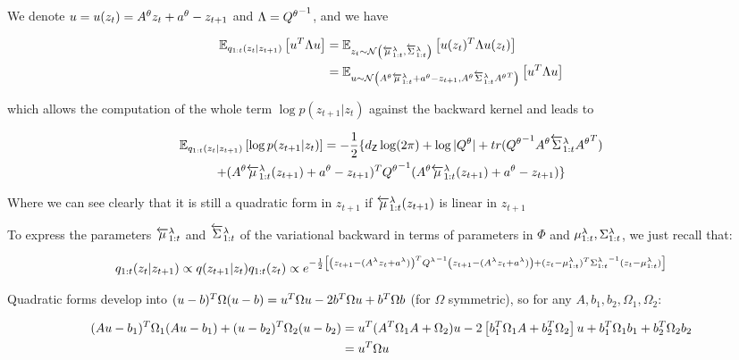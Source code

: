 \documentclass{article}
\begin{document}
We denote $u = u(z_t) = A^\theta z_t + a^\theta - z_{t+1}$ and $\Lambda = {Q^\theta}^{-1}$, and we have

\begin{align*}
    \mathbb{E}_{q_{1:t}(z_{t}|z_{t + 1})}\left[u^T \Lambda u\right] &= \mathbb{E}_{z_t \sim \mathcal{N}\left( \overleftarrow{\mu}_{1:t}^\lambda, \overleftarrow{\Sigma}_{1:t}^\lambda \right)}\left[u(z_t)^T \Lambda u(z_t)\right] \\
    &=  \mathbb{E}_{u \sim \mathcal{N}\left( A^\theta \overleftarrow{\mu}_{1:t}^\lambda + a^\theta - z_{t+1}, A^\theta \overleftarrow{\Sigma}_{1:t}^\lambda {A^\theta}^T \right)}\left[u^T \Lambda u\right]
\end{align*}


which allows the computation of the whole term $\log p(z_{t+1}|z_t)$ against the backward kernel and leads to

\begin{multline*}
    \mathbb{E}_{q_{1:t}(z_{t}|z_{t + 1})}\left[\log p(z_{t+1}|z_t)\right] = -\frac{1}{2}\{d_\mathsf{Z} \log(2\pi) + \log |Q^\theta| + tr({Q^\theta}^{-1} A^\theta \overleftarrow{\Sigma}_{1:t}^\lambda {A^\theta}^T) \\
     + (A^\theta \overleftarrow{\mu}_{1:t}^\lambda(z_{t+1}) + a^\theta - z_{t+1})^T {Q^\theta}^{-1} (A^\theta \overleftarrow{\mu}_{1:t}^\lambda(z_{t+1}) + a^\theta - z_{t+1})\} 
\end{multline*}

Where we can see clearly that it is still a quadratic form in $z_{t+1}$ if $\overleftarrow{\mu}_{1:t}^\lambda(z_{t+1})$ is linear in $z_{t+1}$

To express the parameters $\overleftarrow{\mu}_{1:t}^\lambda$ and $\overleftarrow{\Sigma}_{1:t}^\lambda$ of the variational backward in terms of parameters in $\Phi$ and $\mu_{1:t}^\lambda,\Sigma_{1:t}^\lambda$, we just recall that: 

\begin{equation*}
    q_{1:t}(z_{t}|z_{t + 1}) \propto q(z_{t+1}|z_t) q_{1:t}(z_{t}) \propto e^{-\frac{1}{2}\left[\left(z_{t+1} - (A^\lambda z_t + a^\lambda)\right)^T {Q^\lambda}^{-1} \left(z_{t+1} - (A^\lambda z_t + a^\lambda)\right) + (z_t - \mu_{1:t}^\lambda)^T {\Sigma_{1:t}^\lambda}^{-1} (z_t - \mu_{1:t}^\lambda) \right]}
\end{equation*}

Quadratic forms develop into $(u-b)^T \Omega (u-b) = u^T \Omega u - 2b^T \Omega u +b^T \Omega b$ (for $\Omega$ symmetric), so for any $A,b_1,b_2,\Omega_1, \Omega_2$:

\begin{align*}
(Au - b_1)^T \Omega_1 (Au - b_1) + (u-b_2)^T \Omega_2 (u-b_2) &= u^T (A^T\Omega_1 A + \Omega_2) u - 2\left[b_1^T \Omega_1 A + b_2^T \Omega_2 \right]u + b_1^T \Omega_1 b_1 + b_2^T \Omega_2 b_2 \\
    &= u^T \Omega u
\end{align*}
\end{document}
